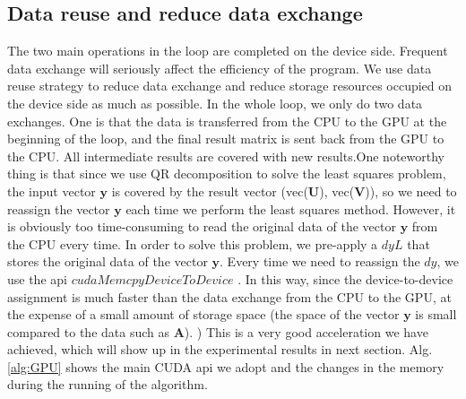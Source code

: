 \documentclass[journal,article,submit,moreauthors,pdftex,10pt,a4paper]{Definitions/mdpi}
\theoremstyle{plain}
\theoremstyle{definition}
\theoremstyle{remark}
\begin{document}
\subsection{Data reuse and reduce data exchange}
The two main operations in the loop are completed on the device side. Frequent data exchange will seriously affect the efficiency of the program. We use data reuse strategy to reduce data exchange and reduce storage resources occupied on the device side as much as possible.
In the whole loop, we only do two data exchanges. One is that the data is transferred from the CPU to the GPU at the beginning of the loop, and the final result matrix is sent back from the GPU to the CPU.
All intermediate results are covered with new results.One noteworthy thing is that since we use QR decomposition to solve the least squares problem, the input vector $\mathbf{y}$ is covered by the result vector (vec($\mathbf{U}$), vec($\mathbf{V}$)), so we need to reassign the vector $\mathbf{y}$ each time we perform the least squares method. However, it is obviously too time-consuming to read the original data of the vector $\mathbf{y}$ from the CPU every time. In order to solve this problem, we pre-apply a $dyL$ that stores the original data of the vector $\mathbf{y}$. Every time we need to reassign the $dy$, we use the api $cudaMemcpyDeviceToDevice$ . In this way, since the device-to-device assignment is much faster than the data exchange from the CPU to the GPU, at the expense of a small amount of storage space (the space of the vector $\mathbf{y}$ is small compared to the data such as $\mathbf{A}$). ) This is a very good acceleration we have achieved, which will show up in the experimental results in next section.
Alg.\ref{alg:GPU} shows the main CUDA api we adopt and the changes in the memory during the running of the algorithm.

\end{document}
